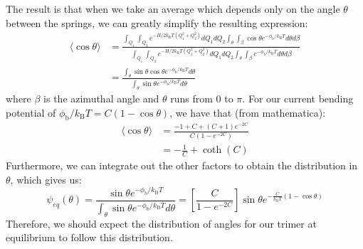 \documentclass{article}
\begin{document}
\begin{enumerate}
The result is that when we take an average which depends only on the angle $\theta$ between the springs, we can greatly simplify the resulting expression:
\begin{align}
    \langle \cos \theta \rangle &= \frac{\int_{Q_1} \int_{Q_2} e^{- H/2k_\mathrm{B} T (Q_1^2 + Q_2^2)} dQ_1 dQ_2 \int_{\theta} \int_{\beta} \cos \theta e^{-\phi_\mathrm{b}/k_\mathrm{B} T}  d\theta d\beta}{\int_{Q_1} \int_{Q_2} e^{- H/2k_\mathrm{B} T (Q_1^2 + Q_2^2)} dQ_1 dQ_2 \int_{\theta} \int_{\beta}  e^{-\phi_\mathrm{b}/k_\mathrm{B} T} d\theta d\beta} \\
    &= \frac{\int_\theta \sin{\theta} \cos{\theta} e^{-\phi_\mathrm{b}/k_\mathrm{B} T} d\theta}{\int_\theta \sin{\theta} e^{-\phi_\mathrm{b}/k_\mathrm{B} T} d\theta}
\end{align}
where $\beta$ is the azimuthal angle and $\theta$ runs from $0$ to $\pi$.
For our current bending potential of $\phi_{\mathrm{b}}/k_\mathrm{B} T = C (1-\cos{\theta})$, we have that (from mathematica):
\begin{align}
    \langle \cos \theta \rangle &= \frac{-1 + C + \left(C+1\right) e^{-2C}}{C\left(1-e^{-2C}\right)} \\
    &= -\frac{1}{C} + \coth(C)
\end{align}
Furthermore, we can integrate out the other factors to obtain the distribution in $\theta$, which gives us:
\begin{equation}
    \psi_{eq}(\theta) = \frac{ \sin{\theta}  e^{-\phi_\mathrm{b}/k_\mathrm{B} T}}{\int_\theta \sin{\theta} e^{-\phi_\mathrm{b}/k_\mathrm{B} T} d\theta} = \left[\frac{C}{1-e^{-2 C}}\right] \sin{\theta} e^{-\frac{C}{k_\mathrm{B}T}\left(1-\cos{\theta}\right)}
\end{equation}
Therefore, we should expect the distribution of angles for our trimer at equilibrium to follow this distribution. 


\end{enumerate}
\end{document}
